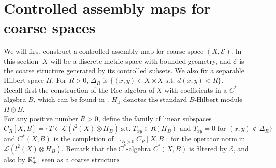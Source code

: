 \section{Controlled assembly maps for coarse spaces}

We will first construct a controlled assembly map for coarse space $(X,\mathcal E)$. In this section, $X$ will be a discrete metric space with bounded geometry, and $\mathcal E$ is the coarse structure generated by its controlled subsets. We also fix a separable Hilbert space $H$. For $R>0$, $\Delta_R$ is $\{(x,y)\in X\times X\text{ s.t. }d(x,y)<R\}$.\\

Recall first the construction of the Roe algebra of $X$ with coefficients in a $C^*$-algebra $B$, which can be found in \cite{SkTuYu}. $H_B$ denotes the standard $B$-Hilbert module $H\otimes B$.\\

For any positive number $R>0$, define the family of linear subspaces 
\[C_R[X,B]=\{T\in \mathcal L(l^2(X)\otimes H_B) \text{ s.t. } T_{xy}\in \mathfrak K(H_B) \text{ and }T_{xy}=0 \text{ for }(x,y)\not\in \Delta_R  \}\]
and $C^*(X,B)$ is the completion of $\cup_{R>0} C_R[X,B]$ for the operator norm in $\mathcal L(l^2(X)\otimes H_B) $. Remark that the $C^*$-algebra $C^*(X,B)$ is filtered by $\mathcal E$, and also by $\mathbb R_+^*$, seen as a coarse structure.\\




